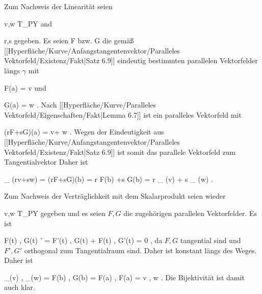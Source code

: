 {

Zum Nachweis der Linearität seien

\mavergleichskette
{\vergleichskette
{ v,w
}
{ \in }{ T_PY
}
{  }{
}
{    }{
}
{   }{
}
}
{}{}{}
and

\mavergleichskette
{\vergleichskette
{ r,s
}
{ \in }{ \R
}
{  }{
}
{    }{
}
{   }{
}
}
{}{}{}
gegeben. Es seien
\mathkor {} {F} {bzw.} {G} {}
die gemäß
[[Hyperfläche/Kurve/Anfangstangentenvektor/Paralleles Vektorfeld/Existenz/Fakt|Satz 6.9]]
eindeutig bestimmten parallelen Vektorfelder längs $\gamma$ mit

\mavergleichskette
{\vergleichskette
{ F(a)
}
{ = }{ v
}
{  }{
}
{    }{
}
{   }{
}
}
{}{}{}
und

\mavergleichskette
{\vergleichskette
{ G(a)
}
{ = }{ w
}
{  }{
}
{    }{
}
{   }{
}
}
{}{}{.}
Nach
[[Hyperfläche/Kurve/Paralleles Vektorfeld/Eigenschaften/Fakt|Lemma 6.7]]
ist
 ein paralleles Vektorfeld mit

\mavergleichskette
{\vergleichskette
{ (rF+sG)(a)
}
{ = }{ v+ w
}
{  }{
}
{    }{
}
{   }{
}
}
{}{}{.}
Wegen der Eindeutigkeit aus
[[Hyperfläche/Kurve/Anfangstangentenvektor/Paralleles Vektorfeld/Existenz/Fakt|Satz 6.9]]
ist somit
 das parallele Vektorfeld zum Tangentialvektor
 Daher ist

\mavergleichskettedisp
{\vergleichskette
{ \Psi_{\gamma} (rv+sw)
}
{ =} { (rF+sG)(b)
}
{ =} { r F(b) +s G(b)
}
{ =} { r \Psi_{\gamma} (v) + s \Psi_{\gamma} (w)
}
{ } {
}
}
{}{}{.}

Zum Nachweis der Verträglichkeit mit dem Skalarprodukt seien wieder

\mavergleichskette
{\vergleichskette
{ v,w
}
{ \in }{ T_PY
}
{  }{
}
{    }{
}
{   }{
}
}
{}{}{}
gegeben und es seien $F,G$ die zugehörigen parallelen Vektorfelder. Es ist

\mavergleichskettedisp
{\vergleichskette
{ \left\langle  F(t) , G(t)  \right\rangle'
}
{ =} { \left\langle  F'(t) , G(t)  \right\rangle  +  \left\langle  F(t) , G'(t)  \right\rangle
}
{ =} { 0
}
{ } {
}
{ } {
}
}
{}{}{,}
da $F,G$ tangential sind und $F',G'$ orthogonal zum Tangentialraum sind. Daher ist
 konstant längs des Weges. Daher ist

\mavergleichskettedisp
{\vergleichskette
{ \left\langle \Psi_\gamma(v)  , \Psi_\gamma(w)  \right\rangle
}
{ =} { \left\langle  F(b)  ,  G(b)   \right\rangle
}
{ =} { \left\langle  F(a)  ,  F(a)   \right\rangle
}
{ =} { \left\langle  v  , w  \right\rangle
}
{ } {
}
}
{}{}{.}
Die Bijektivität ist damit auch klar.

}

